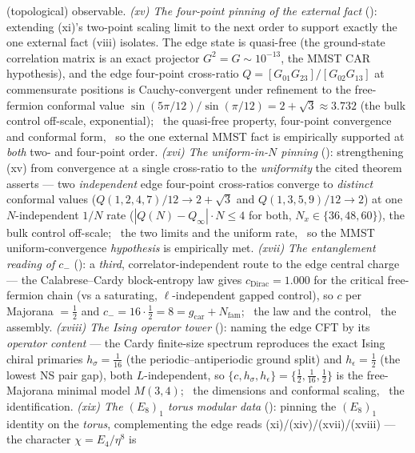 \documentclass[11pt,a4paper]{article}
\newcommand{\Nfam}{N_{\mathrm{fam}}}
\newcommand{\gcar}{g_{\mathrm{car}}}
\begin{document}
\begin{keybox}
(topological) observable. \emph{(xv) The four-point pinning of the external fact}
(): extending (xi)'s two-point scaling limit to the next order to support
exactly the one external fact (viii) isolates. The edge state is quasi-free (the ground-state correlation matrix is
an exact projector $G^2{=}G\sim10^{-13}$, the MMST CAR hypothesis), and the edge four-point cross-ratio
$Q{=}[G_{01}G_{23}]/[G_{02}G_{13}]$ at commensurate positions is Cauchy-convergent under refinement to the
free-fermion conformal value $\sin(5\pi/12)/\sin(\pi/12){=}2{+}\sqrt3\approx3.732$ (the bulk control off-scale,
exponential); \mE\ the quasi-free property, four-point convergence and conformal form, \mC\ so the one external MMST
fact is empirically supported at \emph{both} two- and four-point order. \emph{(xvi) The uniform-in-$N$ pinning}
(): strengthening (xv) from convergence at a single cross-ratio to the
\emph{uniformity} the cited theorem asserts --- two \emph{independent} edge four-point cross-ratios converge to
\emph{distinct} conformal values ($Q(1,2,4,7)/12\to2{+}\sqrt3$ and $Q(1,3,5,9)/12\to2$) at one $N$-independent
$1/N$ rate ($|Q(N){-}Q_\infty|\cdot N\le4$ for both, $N_x\in\{36,48,60\}$), the bulk control off-scale; \mE\ the
two limits and the uniform rate, \mC\ so the MMST uniform-convergence \emph{hypothesis} is empirically met.
\emph{(xvii) The entanglement reading of $c_-$} (): a \emph{third},
correlator-independent route to the edge central charge --- the Calabrese--Cardy block-entropy law gives
$c_{\mathrm{Dirac}}{=}1.000$ for the critical free-fermion chain (vs a saturating, $\ell$-independent gapped
control), so $c$ per Majorana $=\tfrac12$ and $c_-{=}16\cdot\tfrac12{=}8{=}\gcar{+}\Nfam$; \mE\ the law and the
control, \mC\ the assembly. \emph{(xviii) The Ising operator tower} ():
naming the edge CFT by its \emph{operator content} --- the Cardy finite-size spectrum reproduces the exact Ising
chiral primaries $h_\sigma{=}\tfrac1{16}$ (the periodic--antiperiodic ground split) and $h_\epsilon{=}\tfrac12$ (the
lowest NS pair gap), both $L$-independent, so $\{c,h_\sigma,h_\epsilon\}{=}\{\tfrac12,\tfrac1{16},\tfrac12\}$ is the
free-Majorana minimal model $M(3,4)$; \mE\ the dimensions and conformal scaling, \mC\ the identification.
\emph{(xix) The $(E_8)_1$ torus modular data} (): pinning the $(E_8)_1$ identity on
the \emph{torus}, complementing the edge reads (xi)/(xiv)/(xvii)/(xviii) --- the character $\chi{=}E_4/\eta^8$ is

\end{keybox}
\end{document}
